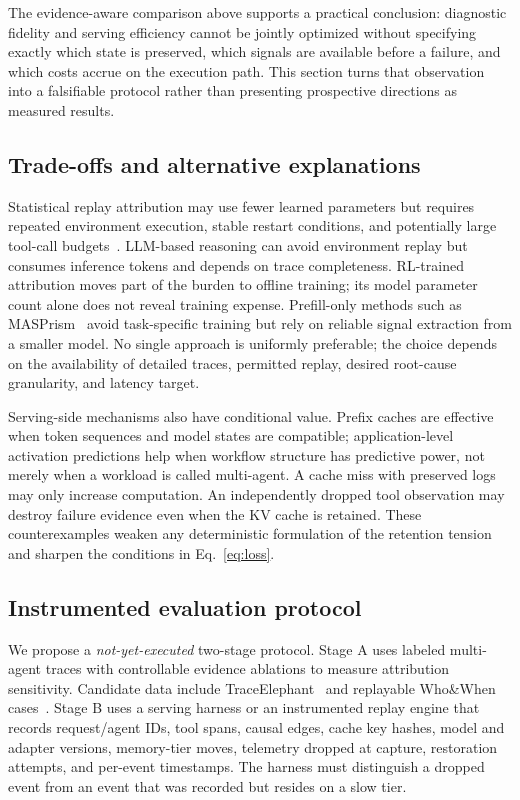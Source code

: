 The evidence-aware comparison above supports a practical conclusion: diagnostic fidelity and serving efficiency cannot be jointly optimized without specifying exactly which state is preserved, which signals are available before a failure, and which costs accrue on the execution path. This section turns that observation into a falsifiable protocol rather than presenting prospective directions as measured results.

\subsection{Trade-offs and alternative explanations}
Statistical replay attribution may use fewer learned parameters but requires repeated environment execution, stable restart conditions, and potentially large tool-call budgets~\cite{famas2025}. LLM-based reasoning can avoid environment replay but consumes inference tokens and depends on trace completeness. RL-trained attribution moves part of the burden to offline training; its model parameter count alone does not reveal training expense. Prefill-only methods such as MASPrism~\cite{masprism2026} avoid task-specific training but rely on reliable signal extraction from a smaller model. No single approach is uniformly preferable; the choice depends on the availability of detailed traces, permitted replay, desired root-cause granularity, and latency target.

Serving-side mechanisms also have conditional value. Prefix caches are effective when token sequences and model states are compatible; application-level activation predictions help when workflow structure has predictive power, not merely when a workload is called multi-agent. A cache miss with preserved logs may only increase computation. An independently dropped tool observation may destroy failure evidence even when the KV cache is retained. These counterexamples weaken any deterministic formulation of the retention tension and sharpen the conditions in Eq.~\ref{eq:loss}.

\subsection{Instrumented evaluation protocol}\label{sec:validation}
We propose a \emph{not-yet-executed} two-stage protocol. Stage A uses labeled multi-agent traces with controllable evidence ablations to measure attribution sensitivity. Candidate data include TraceElephant~\cite{traceelephant2026} and replayable Who\&When cases~\cite{whenwhen2025}. Stage B uses a serving harness or an instrumented replay engine that records request/agent IDs, tool spans, causal edges, cache key hashes, model and adapter versions, memory-tier moves, telemetry dropped at capture, restoration attempts, and per-event timestamps. The harness must distinguish a dropped event from an event that was recorded but resides on a slow tier.

